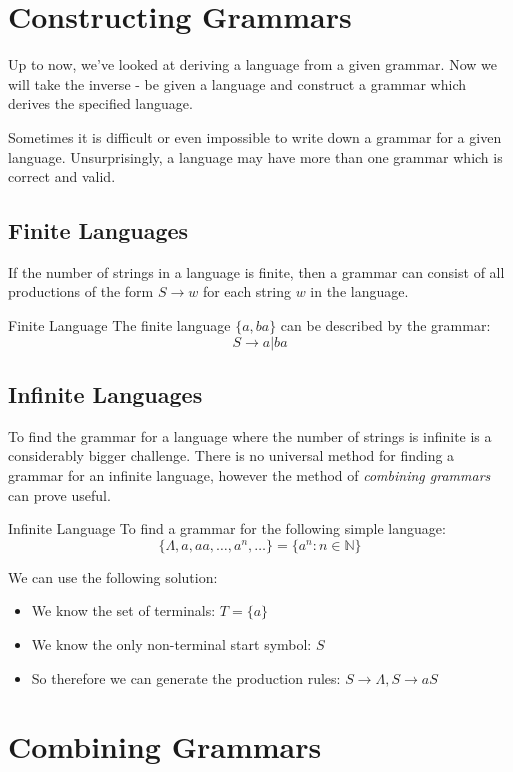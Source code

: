 \section{Constructing Grammars}
Up to now, we've looked at deriving a language from a given grammar. Now we will take the inverse - be given a language and construct a grammar which derives the specified language.

Sometimes it is difficult or even impossible to write down a grammar for a given language. Unsurprisingly, a language may have more than one grammar which is correct and valid.

\subsection{Finite Languages}
If the number of strings in a language is finite, then a grammar can consist of all productions of the form $S \rightarrow w$ for each string $w$ in the language. 

\begin{example}{Finite Language}
The finite language $\{a, ba\}$ can be described by the grammar:
\[S \rightarrow a|ba\]
\end{example}

\subsection{Infinite Languages}
To find the grammar for a language where the number of strings is infinite is a considerably bigger challenge. There is no universal method for finding a grammar for an infinite language, however the method of \textit{combining grammars} can prove useful. 

\begin{example}{Infinite Language}
To find a grammar for the following simple language:
\[\{\Lambda, a, aa, \ldots, a^n, \ldots\} = \{a^n : n \in \mathbb{N}\}\]

We can use the following solution:
\begin{itemize}
    \item We know the set of terminals: $T = \{a\}$
    \item We know the only non-terminal start symbol: $S$
    \item So therefore we can generate the production rules: $S \rightarrow \Lambda, S \rightarrow aS$
\end{itemize}
\end{example}

\section{Combining Grammars}


